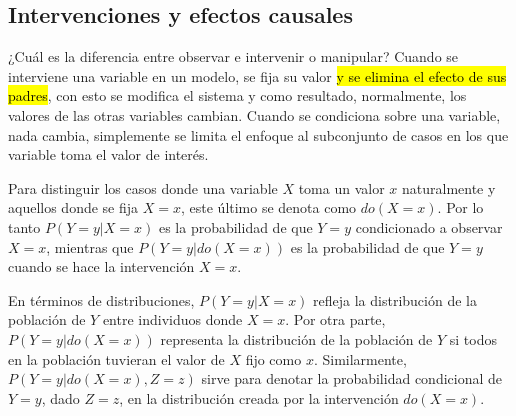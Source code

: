 
\subsection{Intervenciones y efectos causales}

¿Cuál es la diferencia entre observar e intervenir o
manipular? 
Cuando se interviene una variable en un modelo, se fija su valor \hl{y se elimina el efecto de sus padres}, con esto se modifica el sistema y como resultado, normalmente, los valores de las otras variables cambian.
Cuando se condiciona sobre una variable, nada cambia, simplemente se limita el enfoque al subconjunto de casos en los que variable toma el valor de interés. 

Para distinguir los casos donde una variable $X$ toma un valor $x$ naturalmente
y aquellos donde se fija $X = x$, este último se denota como $do(X=x)$.
Por lo tanto $P(Y=y|X=x)$ es la probabilidad de que $Y = y$ condicionado a 
observar $X=x$, mientras que $P(Y=y|do(X=x))$ es la  probabilidad de que $Y=y$
cuando se hace la intervención $X=x$.


En términos de distribuciones, $P(Y = y|X = x)$ refleja la distribución 
de la población de $Y$ entre individuos donde $X=x$.
Por otra parte, $P(Y = y|do(X = x))$ representa la distribución de
la población de $Y$ si todos en la población tuvieran el valor de $X$ fijo como
$x$.
Similarmente, $P(Y = y|do(X = x), Z = z)$ sirve para denotar
la probabilidad condicional de $Y = y$, dado $Z = z$, 
en la distribución creada por la intervención $do(X = x)$.

